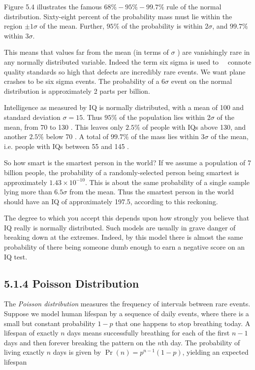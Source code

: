 \documentclass[10pt]{article}
\begin{document}
Figure 5.4 illustrates the famous $68 \%-95 \%-99.7 \%$ rule of the normal distribution. Sixty-eight percent of the probability mass must lie within the region $\pm 1 \sigma$ of the mean. Further, $95 \%$ of the probability is within $2 \sigma$, and $99.7 \%$ within $3 \sigma$.

This means that values far from the mean (in terms of $\sigma$ ) are vanishingly rare in any normally distributed variable. Indeed the term six sigma is used to\
\
connote quality standards so high that defects are incredibly rare events. We want plane crashes to be six sigma events. The probability of a $6 \sigma$ event on the normal distribution is approximately 2 parts per billion.

Intelligence as measured by IQ is normally distributed, with a mean of 100 and standard deviation $\sigma=15$. Thus $95 \%$ of the population lies within $2 \sigma$ of the mean, from 70 to 130 . This leaves only $2.5 \%$ of people with IQs above 130, and another $2.5 \%$ below 70 . A total of $99.7 \%$ of the mass lies within $3 \sigma$ of the mean, i.e. people with IQs between 55 and 145 .

So how smart is the smartest person in the world? If we assume a population of 7 billion people, the probability of a randomly-selected person being smartest is approximately $1.43 \times 10^{-10}$. This is about the same probability of a single sample lying more than $6.5 \sigma$ from the mean. Thus the smartest person in the world should have an IQ of approximately 197.5, according to this reckoning.

The degree to which you accept this depends upon how strongly you believe that IQ really is normally distributed. Such models are usually in grave danger of breaking down at the extremes. Indeed, by this model there is almost the same probability of there being someone dumb enough to earn a negative score on an IQ test.

\subsection*{5.1.4 Poisson Distribution}
The \emph{Poisson distribution} measures the frequency of intervals between rare events. Suppose we model human lifespan by a sequence of daily events, where there is a small but constant probability $1-p$ that one happens to stop breathing today. A lifespan of exactly $n$ days means successfully breathing for each of the first $n-1$ days and then forever breaking the pattern on the $n$th day. The probability of living exactly $n$ days is given by $\operatorname{Pr}(n)=p^{n-1}(1-p)$, yielding an expected lifespan
\end{document}
